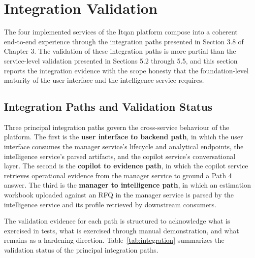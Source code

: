 \section{Integration Validation}
The four implemented services of the Itqan platform compose into a coherent end-to-end experience through the integration paths presented in Section 3.8 of Chapter 3. The validation of these integration paths is more partial than the service-level validation presented in Sections 5.2 through 5.5, and this section reports the integration evidence with the scope honesty that the foundation-level maturity of the user interface and the intelligence service requires.

\subsection{Integration Paths and Validation Status}
Three principal integration paths govern the cross-service behaviour of the platform. The first is the \textbf{user interface to backend path}, in which the user interface consumes the manager service's lifecycle and analytical endpoints, the intelligence service's parsed artifacts, and the copilot service's conversational layer. The second is the \textbf{copilot to evidence path}, in which the copilot service retrieves operational evidence from the manager service to ground a Path 4 answer. The third is the \textbf{manager to intelligence path}, in which an estimation workbook uploaded against an RFQ in the manager service is parsed by the intelligence service and its profile retrieved by downstream consumers.

The validation evidence for each path is structured to acknowledge what is exercised in tests, what is exercised through manual demonstration, and what remains as a hardening direction. Table~\ref{tab:integration} summarizes the validation status of the principal integration paths.

